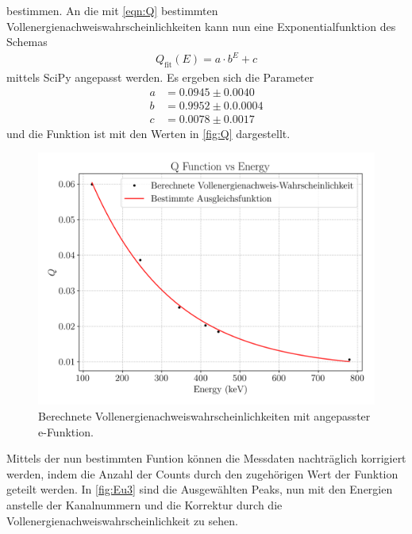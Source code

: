bestimmen.
An die mit \autoref{eqn:Q} bestimmten Vollenergienachweiswahrscheinlichkeiten kann nun eine Exponentialfunktion des Schemas
\begin{align*}
  Q_\text{fit}(E)=a\cdot b^E+c
\end{align*}
mittels SciPy angepasst werden.
Es ergeben sich die Parameter
\begin{align}
  a &= 0.0945\pm0.0040\\
   b &= 0.9952\pm0.0.0004\\
    c &= 0.0078\pm0.0017
\end{align}
und die Funktion ist mit den Werten in \autoref{fig:Q} dargestellt.
\begin{figure}[H]
  \centering
  \includegraphics[scale=0.65]{Skripte/Qfunc.png}
  \caption{Berechnete Vollenergienachweiswahrscheinlichkeiten mit angepasster e-Funktion.}
  \label{fig:Q}
\end{figure}
Mittels der nun bestimmten Funtion können die Messdaten nachträglich korrigiert werden, indem die Anzahl der Counts durch den zugehörigen Wert der Funktion geteilt werden.
In \autoref{fig:Eu3} sind die Ausgewählten Peaks, nun mit den Energien anstelle der Kanalnummern und die Korrektur durch die Vollenergienachweiswahrscheinlichkeit zu sehen. 
